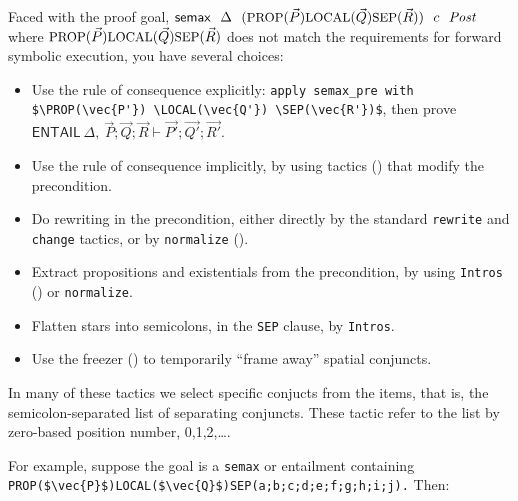 \documentclass[12pt,fleqn,openany,oneside,showtrims]{memoir}
\begin{document}
Faced with the proof goal,\hfill
$\mathsf{semax}~~\Delta~~(\mbox{\small PROP}(\vec{P}) \mbox{\small LOCAL}(\vec{Q}) \mbox{\small SEP}(\vec{R}))~~c~~\mathit{Post}$
where $\mbox{\small PROP}(\vec{P}) \mbox{\small LOCAL}(\vec{Q}) \mbox{\small SEP}(\vec{R})$ does not match
the requirements for forward symbolic execution,
you have several choices:
\begin{itemize}
\item Use the rule of consequence explicitly:\newline
\lstinline|apply semax_pre with $\PROP(\vec{P'}) \LOCAL(\vec{Q'}) \SEP(\vec{R'})$|,\newline
then prove $\mathsf{ENTAIL}~\Delta,~\vec{P};\vec{Q};\vec{R}\vdash\vec{P'};\vec{Q'};\vec{R'}$.
\item Use the rule of consequence implicitly,
by using tactics () that modify the precondition.
\item Do rewriting in the precondition, either directly by the
standard \lstinline{rewrite} and \lstinline{change} tactics,
or by \lstinline{normalize} ().
\item Extract propositions and existentials from the precondition,
by using \lstinline{Intros} ()
or \lstinline{normalize}.
\item Flatten stars into semicolons, in the \lstinline{SEP} clause,
 by \lstinline{Intros}.
\item Use the freezer () to temporarily ``frame away'' spatial conjuncts.
\end{itemize}

\newpage
{}
\label{refcard:manip}
In many of these tactics we select specific conjucts from the
\SEP{} items, that is, the semicolon-separated list of
separating conjuncts.  These tactic refer to the list
by zero-based position number, 0,1,2,\ldots.

For example, suppose the goal is a \lstinline{semax}
or entailment containing \lstinline|PROP($\vec{P}$)LOCAL($\vec{Q}$)SEP(a;b;c;d;e;f;g;h;i;j).|
Then:
\end{document}
